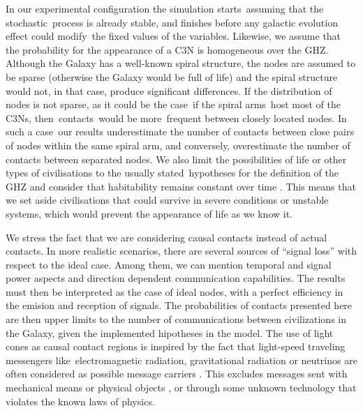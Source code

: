 \documentclass[crop]{CSLB}
\newcommand{\ceti}{C3N}
\newcommand{\cetis}{C3Ns}
\begin{document}
In our experimental configuration the simulation starts assuming that the
stochastic process is already stable, and finishes before any galactic
evolution effect could modify the fixed values of the variables.
%
Likewise, we assume that the probability for the appearance of a \ceti{} is
homogeneous over the GHZ.
%
Although the Galaxy has a well-known spiral structure, the nodes are assumed
to be sparse (otherwise the Galaxy would be full of life) and the spiral
structure would not, in that case, produce significant differences.
%
If the distribution of nodes is not sparse, as it could be the case if the
spiral arms host most of the \cetis{}, then contacts would be more frequent
between closely located nodes.
%
In such a case our results underestimate the number of contacts between
close pairs of nodes within the same spiral arm, and conversely, overestimate
the number of contacts between separated nodes.
%
We also limit the possibilities of life or other types of civilisations to the
usually stated hypotheses for the definition of the GHZ
\citep{dayal_habitability_2016, gonzalez_galactic_2001,
lineweaver_galactic_2004, gonzalez_habitable_2005, morrison_extending_2015,
haqq-misra_evolution_2019, rahvar_cosmic_2016, gobat_evolution_2016,
rahvar_cosmic_2016} and consider that habitability remains constant over time
\citep[see, however, ][]{gonzalez_habitable_2005, dayal_habitability_2016,
gobat_evolution_2016}.
%
This means that we set aside civilisations that could survive in severe
conditions or unstable systems, which would prevent the appearance of life as
we know it.  



We stress the fact that we are
considering causal contacts instead of actual contacts.
%
In more realistic scenarios, there are several sources of ``signal loss'' with
respect to the ideal case.
%
Among them, we can mention temporal and signal power aspects and direction
dependent communication capabilities.
%
The results must then be interpreted as the case of ideal nodes, with a perfect
efficiency in the emision and reception of signals.
%
The probabilities of contacts presented here are then upper limits to the
number of communications between civilizations in the Galaxy, given the
implemented hipotheses in the model.
%
The use of light cones as causal contact regions is inspired by the fact that
light-speed traveling messengers like electromagnetic radiation, gravitational
radiation or neutrinos are often considered as possible message carriers
\citep{hippke_interstellar_2017, wright_how_2018}.
%
This excludes messages sent with mechanical means or physical objects
\citep[e.g., ][]{Armstrong2013, barlow_galactic_2013}, or through some unknown
technology that violates the known laws of physics.
\end{document}
